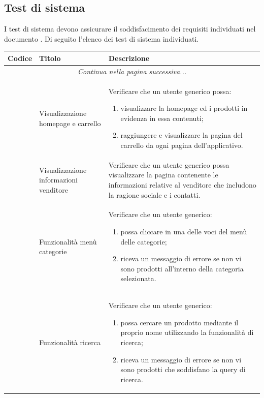 \subsection{Test di sistema}

I test di sistema devono assicurare il soddisfacimento dei requisiti individuati nel documento . 
Di seguito l'elenco dei test di sistema individuati.

\newpage


\begin{center}
	\begin{longtable}{|p{1cm}|p{4.85cm}|p{9cm}|}
	\hline
	\rowcolor{lighter-grayer}
	\textbf{Codice} & \textbf{Titolo} & \textbf{Descrizione} \\
	\hline
	\endfirsthead
	\hline
	\multicolumn{3}{|c|}{\textit{Continua nella pagina successiva...}} \\
	\hline
	\endfoot
	\endlastfoot


	\hline
	
	 & Visualizzazione homepage e carrello & Verificare che un utente generico possa:
	\begin{enumerate}
		\item  visualizzare la homepage ed i prodotti in evidenza in essa contenuti;
		\item  raggiungere e visualizzare la pagina del carrello da ogni pagina dell'applicativo.
	\end{enumerate} \\

	 & Visualizzazione informazioni venditore & Verificare che un utente generico possa visualizzare la pagina contenente le informazioni relative al venditore che includono la ragione sociale e i contatti. \\

	 & Funzionalità menù categorie & Verificare che un utente generico: 
	\begin{enumerate}
		\item  possa cliccare in una delle voci del menù delle categorie;
		\item  riceva un messaggio di errore se non vi sono prodotti all'interno della categoria selezionata.
	\end{enumerate} \\

	 & Funzionalità ricerca & Verificare che un utente generico: 
	\begin{enumerate}
		\item  possa cercare un prodotto mediante il proprio nome utilizzando la funzionalità di ricerca;
		\item  riceva un messaggio di errore se non vi sono prodotti che soddisfano la query di ricerca.
	\end{enumerate} \\



\end{longtable}
\end{center}
